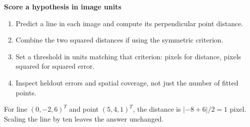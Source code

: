 \documentclass[letterpaper,11pt,english,openany,oneside]{jupyterBook}
\begin{document}
\begin{TextbookBox}
\textbf{Score a hypothesis in image units}\par\smallskip
\begin{enumerate}
%
\item {}
\sphinxAtStartPar
Predict a line in each image and compute its perpendicular point distance.

\item {}
\sphinxAtStartPar
Combine the two squared distances if using the symmetric criterion.

\item {}
\sphinxAtStartPar
Set a threshold in units matching that criterion: pixels for distance, pixels squared for squared error.

\item {}
\sphinxAtStartPar
Inspect held\sphinxhyphen{}out errors and spatial coverage, not just the number of fitted points.

\end{enumerate}

\sphinxAtStartPar
For line \((0,-2,6)^T\) and point \((5,4,1)^T\), the distance is \(|-8+6|/2=1\) pixel. Scaling the line by ten leaves the answer unchanged.

\end{TextbookBox}
\label{\detokenize{lectures/lecture04/estimation:ex-lec04-eightpoint}}
\end{document}
